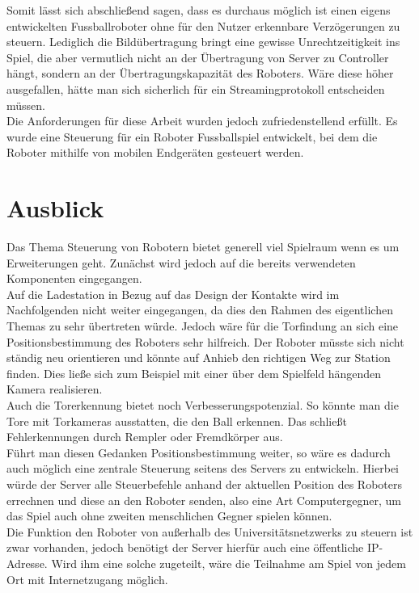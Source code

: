 Somit lässt sich abschließend sagen, dass es durchaus möglich ist einen eigens entwickelten Fussballroboter ohne für den Nutzer erkennbare Verzögerungen zu steuern. Lediglich die Bildübertragung bringt eine gewisse Unrechtzeitigkeit ins Spiel, die aber vermutlich nicht an der Übertragung von Server zu Controller hängt, sondern an der Übertragungskapazität des Roboters. Wäre diese höher ausgefallen, hätte man sich sicherlich für ein Streamingprotokoll entscheiden müssen.\\
Die Anforderungen für diese Arbeit wurden jedoch zufriedenstellend erfüllt. Es wurde eine Steuerung für ein Roboter Fussballspiel entwickelt, bei dem die Roboter mithilfe von mobilen Endgeräten gesteuert werden.





\section{Ausblick}

Das Thema Steuerung von Robotern bietet generell viel Spielraum wenn es um Erweiterungen geht. Zunächst wird jedoch auf die bereits verwendeten Komponenten eingegangen.\\
Auf die Ladestation in Bezug auf das Design der Kontakte wird im Nachfolgenden nicht weiter eingegangen, da dies den Rahmen des eigentlichen Themas zu sehr übertreten würde. Jedoch wäre für die Torfindung an sich eine Positionsbestimmung des Roboters sehr hilfreich. Der Roboter müsste sich nicht ständig neu orientieren und könnte auf Anhieb den richtigen Weg zur Station finden. Dies ließe sich zum Beispiel mit einer über dem Spielfeld hängenden Kamera realisieren.  \\
Auch die Torerkennung bietet noch Verbesserungspotenzial. So könnte man die Tore mit Torkameras ausstatten, die den Ball erkennen. Das schließt Fehlerkennungen durch Rempler oder Fremdkörper aus. \\

Führt man diesen Gedanken Positionsbestimmung weiter, so wäre es dadurch auch möglich eine zentrale Steuerung seitens des Servers zu entwickeln. Hierbei würde der Server alle Steuerbefehle anhand der aktuellen Position des Roboters errechnen und diese an den Roboter senden, also eine Art Computergegner, um das Spiel auch ohne zweiten menschlichen Gegner spielen können. \\
Die Funktion den Roboter von außerhalb des Universitätsnetzwerks zu steuern ist zwar vorhanden, jedoch benötigt der Server hierfür auch eine öffentliche IP-Adresse. Wird ihm eine solche zugeteilt, wäre die Teilnahme am Spiel von jedem Ort mit Internetzugang möglich.
